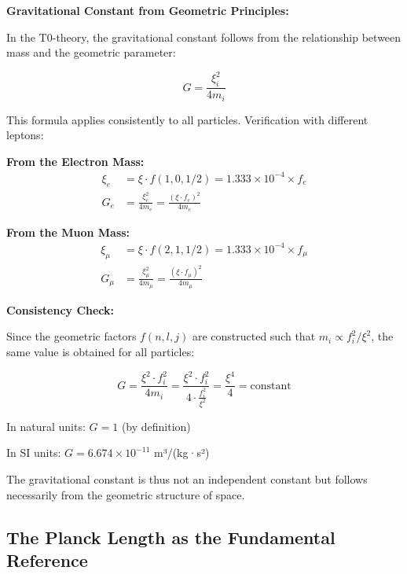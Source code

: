 \documentclass[12pt,a4paper]{article}
\begin{document}
	\begin{keyresult}
		\textbf{Gravitational Constant from Geometric Principles:}
		
		In the T0-theory, the gravitational constant follows from the relationship between mass and the geometric parameter:
		
		\begin{equation}
			G = \frac{\xi_i^2}{4m_i}
		\end{equation}
		
		This formula applies consistently to all particles. Verification with different leptons:
		
		\textbf{From the Electron Mass:}
		\begin{align}
			\xi_e &= \xi \cdot f(1,0,1/2) = 1.333 \times 10^{-4} \times f_e \\
			G_e &= \frac{\xi_e^2}{4m_e} = \frac{(\xi \cdot f_e)^2}{4m_e}
		\end{align}
		
		\textbf{From the Muon Mass:}
		\begin{align}
			\xi_\mu &= \xi \cdot f(2,1,1/2) = 1.333 \times 10^{-4} \times f_\mu \\
			G_\mu &= \frac{\xi_\mu^2}{4m_\mu} = \frac{(\xi \cdot f_\mu)^2}{4m_\mu}
		\end{align}
		
		\textbf{Consistency Check:}
		
		Since the geometric factors $f(n,l,j)$ are constructed such that $m_i \propto f_i^2/\xi^2$, the same value is obtained for all particles:
		
		\begin{equation}
			G = \frac{\xi^2 \cdot f_i^2}{4m_i} = \frac{\xi^2 \cdot f_i^2}{4 \cdot \frac{f_i^2}{\xi^2}} = \frac{\xi^4}{4} = \text{constant}
		\end{equation}
		
		In natural units: $G = 1$ (by definition)
		
		In SI units: $G = 6.674 \times 10^{-11}$ m³/(kg·s²)
		
		The gravitational constant is thus not an independent constant but follows necessarily from the geometric structure of space.
	\end{keyresult}
	
	\subsection{The Planck Length as the Fundamental Reference}
	
\end{document}
